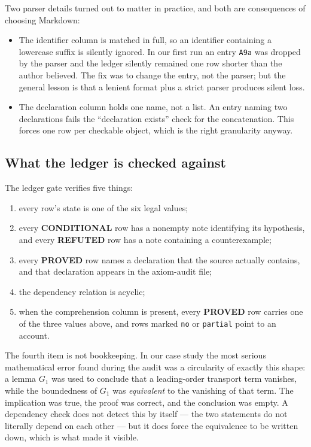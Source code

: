 \documentclass[11pt]{article}
\newcommand{\claim}[1]{\textbf{#1}}
\newcommand{\code}[1]{\texttt{#1}}
\begin{document}
Two parser details turned out to matter in practice, and both are
consequences of choosing Markdown:

\begin{itemize}
\item The identifier column is matched in full, so an identifier containing a
  lowercase suffix is silently ignored. In our first run an entry
  \code{A9a} was dropped by the parser and the ledger silently remained one
  row shorter than the author believed. The fix was to change the entry, not
  the parser; but the general lesson is that a lenient format plus a strict
  parser produces silent loss.
\item The declaration column holds one name, not a list. An entry naming two
  declarations fails the ``declaration exists'' check for the concatenation.
  This forces one row per checkable object, which is the right granularity
  anyway.
\end{itemize}

\subsection{What the ledger is checked against}

The ledger gate verifies five things:

\begin{enumerate}
\item every row's state is one of the six legal values;
\item every \claim{CONDITIONAL} row has a nonempty note identifying its
  hypothesis, and every \claim{REFUTED} row has a note containing a
  counterexample;
\item every \claim{PROVED} row names a declaration that the source actually
  contains, and that declaration appears in the axiom-audit file;
\item the dependency relation is acyclic;
\item when the comprehension column is present, every \claim{PROVED} row
  carries one of the three values above, and rows marked \code{no} or
  \code{partial} point to an account.
\end{enumerate}

The fourth item is not bookkeeping. In our case study the most serious
mathematical error found during the audit was a circularity of exactly this
shape: a lemma $G_1$ was used to conclude that a leading-order transport term
vanishes, while the boundedness of $G_1$ was \emph{equivalent} to the vanishing
of that term. The implication was true, the proof was correct, and the
conclusion was empty. A dependency check does not detect this by itself ---
the two statements do not literally depend on each other --- but it does
force the equivalence to be written down, which is what made it visible.
\end{document}
